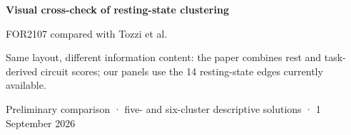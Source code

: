 \documentclass[aspectratio=169,10pt]{beamer}
\begin{document}
\begin{frame}[plain]
  \vfill
  \vspace{.30cm}

  {\color{Navy}\fontsize{28}{32}\selectfont\bfseries Visual cross-check of resting-state clustering\par}
  \vspace{.18cm}
  {\color{Muted}\Large FOR2107 compared with Tozzi et al.\par}
  \vspace{.48cm}
  {\color{Ink}\normalsize Same layout, different information content: the paper combines rest and task-derived circuit scores; our panels use the 14 resting-state edges currently available.\par}
  \vfill
  {\color{Muted}\small Preliminary comparison · five- and six-cluster descriptive solutions · 1 September 2026}
\end{frame}
\end{document}
